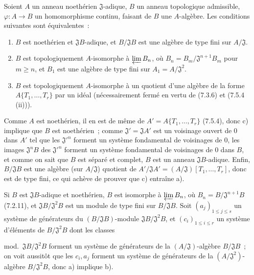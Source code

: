 \begin{proposition}[7.5.5]
\label{0.7.5.5-fr}
Soient $A$ un anneau noethérien $\mathfrak J$-adique, $B$ un anneau topologique
admissible, $\varphi:A\to B$ un homomorphisme continu, faisant de $B$ une
$A$-algèbre. Les conditions suivantes sont équivalentes~:
\begin{enumerate}
  \item[a)] $B$ est noethérien et $\mathfrak JB$-adique, et
  $B/\mathfrak JB$ est une algèbre de type fini sur $A/\mathfrak J$.

  \item[b)] $B$ est topologiquement $A$-isomorphe à $\varprojlim B_n$, où
  $B_n=B_m/\mathfrak J^{n+1}B_m$ pour $m\geq n$, et $B_1$ est une algèbre de
  type fini sur $A_1=A/\mathfrak J^2$.

  \item[c)] $B$ est topologiquement $A$-isomorphe à un quotient d'une algèbre
  de la forme\linebreak $A\{T_1,\ldots,T_r\}$ par un idéal (nécessairement fermé en vertu
  de (7.3.6) et (7.5.4 (ii))).
\end{enumerate}
\end{proposition}

Comme $A$ est noethérien, il en est de même de
$A'=A\{T_1,\ldots,T_r\}$ (7.5.4), donc c) implique que $B$ est noethérien~;
comme $\mathfrak J'=\mathfrak JA'$ est un voisinage ouvert de 0 dans $A'$ tel
que les $\mathfrak J'^{n}$ forment un système fondamental de voisinages de 0,
les images $\mathfrak J^nB$ des $\mathfrak J'^{n}$ forment un système
fondamental de voisinages de 0 dans $B$, et comme on sait que $B$ est séparé et
complet, $B$ est un anneau $\mathfrak JB$-adique. Enfin, $B/\mathfrak JB$ est
une algèbre (sur $A/\mathfrak J$) quotient de
$A'/\mathfrak JA'=(A/\mathfrak J)[T_1,\ldots,T_r]$, donc est de type fini, ce
qui achève de prouver que c) entraîne a).

Si $B$ est $\mathfrak JB$-adique et noethérien, $B$ est isomorphe à
$\varprojlim B_n$, où $B_n=B/\mathfrak J^{n+1}B$ (7.2.11), et
$\mathfrak JB/\mathfrak J^2B$ est un module de type fini sur
$B/\mathfrak JB$. Soit $(a_j)_{1\leq j\leq s}$ un système de générateurs du
$(B/\mathfrak JB)$-module $\mathfrak JB/\mathfrak J^2B$, et
$(c_i)_{1\leq i\leq r}$ un système d'éléments de $B/\mathfrak J^2B$ dont les
classes


mod.~$\mathfrak JB/\mathfrak J^2B$ forment un système de générateurs de la
$(A/\mathfrak J)$-algèbre $B/\mathfrak JB$~; on voit aussitôt que les $c_i,a_j$
forment un système de générateurs de la $(A/\mathfrak J^2)$-algèbre
$B/\mathfrak J^2B$, donc a) implique b).

